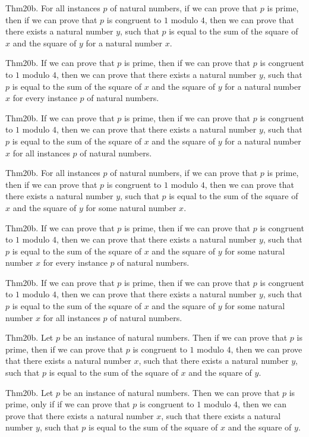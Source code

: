 \documentclass{article}
\begin{document}
Thm20b. For all instances $p$ of natural numbers, if we can prove that $p$ is prime, then if we can prove that $p$ is congruent to $1$ modulo $4$, then we can prove that there exists a natural number $y$, such that $p$ is equal to the sum of the square of $x$ and the square of $y$ for a natural number $x$.

Thm20b. If we can prove that $p$ is prime, then if we can prove that $p$ is congruent to $1$ modulo $4$, then we can prove that there exists a natural number $y$, such that $p$ is equal to the sum of the square of $x$ and the square of $y$ for a natural number $x$ for every instance $p$ of natural numbers.

Thm20b. If we can prove that $p$ is prime, then if we can prove that $p$ is congruent to $1$ modulo $4$, then we can prove that there exists a natural number $y$, such that $p$ is equal to the sum of the square of $x$ and the square of $y$ for a natural number $x$ for all instances $p$ of natural numbers.

Thm20b. For all instances $p$ of natural numbers, if we can prove that $p$ is prime, then if we can prove that $p$ is congruent to $1$ modulo $4$, then we can prove that there exists a natural number $y$, such that $p$ is equal to the sum of the square of $x$ and the square of $y$ for some natural number $x$.

Thm20b. If we can prove that $p$ is prime, then if we can prove that $p$ is congruent to $1$ modulo $4$, then we can prove that there exists a natural number $y$, such that $p$ is equal to the sum of the square of $x$ and the square of $y$ for some natural number $x$ for every instance $p$ of natural numbers.

Thm20b. If we can prove that $p$ is prime, then if we can prove that $p$ is congruent to $1$ modulo $4$, then we can prove that there exists a natural number $y$, such that $p$ is equal to the sum of the square of $x$ and the square of $y$ for some natural number $x$ for all instances $p$ of natural numbers.

Thm20b. Let $p$ be an instance of natural numbers. Then if we can prove that $p$ is prime, then if we can prove that $p$ is congruent to $1$ modulo $4$, then we can prove that there exists a natural number $x$, such that there exists a natural number $y$, such that $p$ is equal to the sum of the square of $x$ and the square of $y$.

Thm20b. Let $p$ be an instance of natural numbers. Then we can prove that $p$ is prime, only if if we can prove that $p$ is congruent to $1$ modulo $4$, then we can prove that there exists a natural number $x$, such that there exists a natural number $y$, such that $p$ is equal to the sum of the square of $x$ and the square of $y$.
\end{document}
